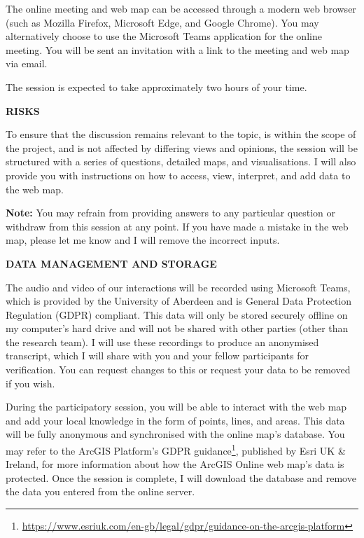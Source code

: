 {The online meeting and web map can be accessed through a modern web browser (such as Mozilla Firefox, Microsoft Edge, and Google Chrome). You may alternatively choose to use the Microsoft Teams application for the online meeting. You will be sent an invitation with a link to the meeting and web map via email.

The session is expected to take approximately two hours of your time.

\vspace{20pt}
\textbf{\MakeUppercase{Risks}}

To ensure that the discussion remains relevant to the topic, is within the scope of the project, and is not affected by differing views and opinions, the session will be structured with a series of questions, detailed maps, and visualisations. I will also provide you with instructions on how to access, view, interpret, and add data to the web map.

\textbf{Note:} You may refrain from providing answers to any particular question or withdraw from this session at any point. If you have made a mistake in the web map, please let me know and I will remove the incorrect inputs.

\vspace{20pt}
\textbf{\MakeUppercase{Data management and storage}}

The audio and video of our interactions will be recorded using Microsoft Teams, which is provided by the University of Aberdeen and is General Data Protection Regulation (GDPR) compliant. This data will only be stored securely offline on my computer's hard drive and will not be shared with other parties (other than the research team). I will use these recordings to produce an anonymised transcript, which I will share with you and your fellow participants for verification. You can request changes to this or request your data to be removed if you wish.

During the participatory session, you will be able to interact with the web map and add your local knowledge in the form of points, lines, and areas. This data will be fully anonymous and synchronised with the online map's database. You may refer to the ArcGIS Platform's GDPR guidance\footnote{\url{https://www.esriuk.com/en-gb/legal/gdpr/guidance-on-the-arcgis-platform}}, published by Esri UK \& Ireland, for more information about how the ArcGIS Online web map's data is protected. Once the session is complete, I will download the database and remove the data you entered from the online server.

}
